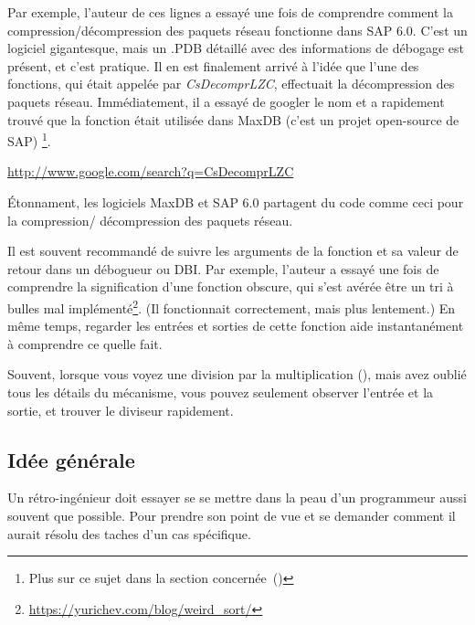 
Par exemple, l'auteur de ces lignes a essayé une fois de comprendre comment la compression/décompression
des paquets réseau fonctionne dans SAP 6.0.
C'est un logiciel gigantesque, mais un .\gls{PDB} détaillé avec des informations
de débogage est présent, et c'est pratique.
Il en est finalement arrivé à l'idée que l'une des fonctions, qui était appelée par
\emph{CsDecomprLZC}, effectuait la décompression des paquets réseau.
Immédiatement, il a essayé de googler le nom et a rapidement trouvé que la fonction
était utilisée dans MaxDB (c'est un projet open-source de SAP)
\footnote{Plus sur ce sujet dans la section concernée~()}.

\url{http://www.google.com/search?q=CsDecomprLZC}

Étonnament, les logiciels MaxDB et SAP 6.0 partagent du code comme ceci pour la compression/
décompression des paquets réseau.


Il est souvent recommandé de suivre les arguments de la fonction et sa valeur de
retour dans un débogueur ou \ac{DBI}.
Par exemple, l'auteur a essayé une fois de comprendre la signification d'une fonction
obscure, qui s'est avérée être un tri à bulles mal implémenté\footnote{\url{https://yurichev.com/blog/weird_sort/}}.
(Il fonctionnait correctement, mais plus lentement.)
En même temps, regarder les entrées et sorties de cette fonction aide instantanément
à comprendre ce quelle fait.

Souvent, lorsque vous voyez une division par la multiplication (),
mais avez oublié tous les détails du mécanisme, vous pouvez seulement observer l'entrée
et la sortie, et trouver le diviseur rapidement.




\subsection{Idée générale}

Un rétro-ingénieur doit essayer se se mettre dans la peau d'un programmeur aussi
souvent que possible.
Pour prendre son point de vue et se demander comment il aurait résolu des taches
d'un cas spécifique.

